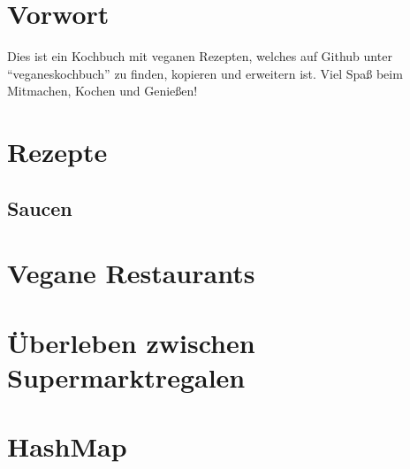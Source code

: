 \documentclass[12pt,a4paper]{article}
\begin{document}


\section{Vorwort}
Dies ist ein Kochbuch mit veganen Rezepten, welches auf Github unter \enquote{veganeskochbuch} zu finden, kopieren und erweitern ist. Viel Spaß beim Mitmachen, Kochen und Genießen!

\clearpage
\section{Rezepte}
	
    
    
    
	
	
	
	
	
	
	
	
	
	
	
	
	
	

\clearpage	
\subsection[Saucen]{Saucen}
	
	
	
	
\clearpage
\section{Vegane Restaurants}
	
	
	
	
	

\clearpage
\section{Überleben zwischen Supermarktregalen}


\clearpage
\section{HashMap}
	
	
\end{document}
